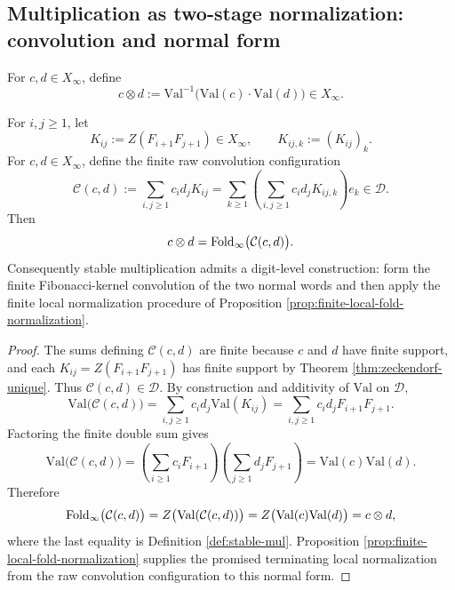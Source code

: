 \subsection{Multiplication as two-stage normalization: convolution and normal form}\label{subsec:emergent-arithmetic-stable-mul}

\begin{definition}\label{def:stable-mul}
For \(c,d\in X_\infty\), define
\[
c\otimes d:=\mathrm{Val}^{-1}\bigl(\mathrm{Val}(c)\cdot\mathrm{Val}(d)\bigr)\in X_\infty.
\]
\end{definition}

\begin{proposition}\label{prop:mul-convolution-normal-form}
For \(i,j\ge 1\), let
\[
K_{ij}:=Z(F_{i+1}F_{j+1})\in X_\infty,
\qquad
K_{ij,k}:=(K_{ij})_k.
\]
For \(c,d\in X_\infty\), define the finite raw convolution configuration
\[
\mathcal{C}(c,d):=
\sum_{i,j\ge 1}c_i d_j K_{ij}
=\sum_{k\ge 1}\left(\sum_{i,j\ge 1}c_i d_jK_{ij,k}\right)e_k
\in\mathcal{D}.
\]
Then
\[
c\otimes d=\operatorname{Fold}_\infty\bigl(\mathcal{C}(c,d)\bigr).
\]
Consequently stable multiplication admits a digit-level construction: form the finite Fibonacci-kernel convolution of the two normal words and then apply the finite local normalization procedure of Proposition \ref{prop:finite-local-fold-normalization}.
\end{proposition}

\begin{proof}
The sums defining \(\mathcal{C}(c,d)\) are finite because \(c\) and \(d\) have finite support, and each \(K_{ij}=Z(F_{i+1}F_{j+1})\) has finite support by Theorem \ref{thm:zeckendorf-unique}. Thus \(\mathcal{C}(c,d)\in\mathcal{D}\). By construction and additivity of \(\mathrm{Val}\) on \(\mathcal{D}\),
\[
\mathrm{Val}\bigl(\mathcal{C}(c,d)\bigr)
=\sum_{i,j\ge 1}c_i d_j\mathrm{Val}(K_{ij})
=\sum_{i,j\ge 1}c_i d_jF_{i+1}F_{j+1}.
\]
Factoring the finite double sum gives
\[
\mathrm{Val}\bigl(\mathcal{C}(c,d)\bigr)
=\left(\sum_{i\ge 1}c_iF_{i+1}\right)
 \left(\sum_{j\ge 1}d_jF_{j+1}\right)
=\mathrm{Val}(c)\mathrm{Val}(d).
\]
Therefore
\[
\operatorname{Fold}_\infty\bigl(\mathcal{C}(c,d)\bigr)
=Z\bigl(\mathrm{Val}(\mathcal{C}(c,d))\bigr)
=Z\bigl(\mathrm{Val}(c)\mathrm{Val}(d)\bigr)
=c\otimes d,
\]
where the last equality is Definition \ref{def:stable-mul}. Proposition \ref{prop:finite-local-fold-normalization} supplies the promised terminating local normalization from the raw convolution configuration to this normal form.
\end{proof}


